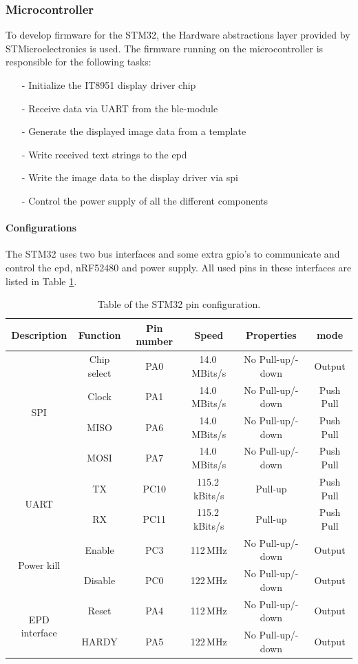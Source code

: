 \subsubsection{Microcontroller}
To develop firmware for the STM32, the Hardware abstractions layer provided by STMicroelectronics is used. The firmware running on the microcontroller is responsible for the following tasks:
\begin{itemize}[ht]
	\item[-] Initialize the IT8951 display driver chip
	\item[-] Receive data via UART from the \acs{ble}-module
	\item[-] Generate the displayed image data from a template
	\item[-] Write received text strings to the \acs{epd}
	\item[-] Write the image data to the display driver via \acs{spi}
	\item[-] Control the power supply of all the different components
\end{itemize}

\paragraph{Configurations}
The STM32 uses two bus interfaces and some extra \acs{gpio}'s to communicate and control the \acs{epd}, nRF52480 and power supply. All used pins in these interfaces are listed in Table \ref{table:stm32}.  

\begin{table}[ht]
	\begin{tabular}{ |c|c|c|c|c|c| } 
		\hline
	Description & Function &Pin number & Speed& Properties& mode \\
		\hline
	\multirow{4}{4em}{SPI} 	& Chip select & PA0&14.0\,MBits/s &No Pull-up/-down& Output \\ 
								& Clock& PA1 & 14.0\,MBits/s&No Pull-up/-down& Push Pull \\ 
								& MISO & PA6&14.0\,MBits/s & No Pull-up/-down& Push Pull  \\ 
								& MOSI & PA7& 14.0\,MBits/s&No Pull-up/-down& Push Pull  \\ 
		\hline
	\multirow{2}{4em}{UART} & TX & PC10 & 115.2\,kBits/s & Pull-up& Push Pull   \\ 
								& RX & PC11 & 115.2\,kBits/s & Pull-up& Push Pull \\ 
	\hline
	
	\multirow{2}{4em}{Power kill} & Enable & PC3 & 112\,MHz &No Pull-up/-down& Output   \\ 
										  & Disable& PC0 & 122\,MHz &No Pull-up/-down& Output \\ 
	\hline
	
	\multirow{2}{4em}{EPD interface} & Reset & PA4 & 112\,MHz &No Pull-up/-down& Output   \\ 
									& HARDY& PA5 & 122\,MHz &No Pull-up/-down& Output \\ 
	\hline

	\end{tabular}
	\caption{Table of the STM32 pin configuration.\label{table:stm32}}
\end{table}

